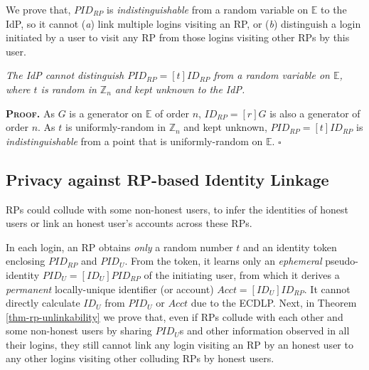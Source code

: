 We prove that, $PID_{RP}$ is \emph{indistinguishable} from a random variable on $\mathbb{E}$ to the IdP,
    so 
 it cannot (\emph{a}) link multiple logins visiting an RP, or (\emph{b}) distinguish a login initiated by a user to visit any RP from those logins visiting other RPs by this user. %


\vspace{-0.5mm}
\begin{thm}
\emph{The IdP cannot distinguish $PID_{RP} = [t]ID_{RP}$ from a random variable on $\mathbb{E}$, where $t$ is random in $\mathbb{Z}_n$ and kept unknown to the IdP.}\label{thm-idp-untraceability}
\end{thm}
\vspace{-0.5mm}

\noindent\textbf{\textsc{Proof.}}
As $G$ is a generator on $\mathbb{E}$ of order $n$, $ID_{RP} = [r]G$ is also a generator of order $n$.
As $t$ is uniformly-random in $\mathbb{Z}_n$ and kept unknown, $PID_{RP} = [t]ID_{RP}$ is \emph{indistinguishable} from a point that is uniformly-random on $\mathbb{E}$. \hfill $\square$
\vspace{1.5mm}


\subsection{Privacy against RP-based Identity Linkage}
\label{subsec:RP-privacy}

RPs could collude with some non-honest users,
    to infer the identities of honest users
    or link an honest user's accounts across these RPs.


In each login, an RP obtains \emph{only} a random number $t$ and an identity token enclosing $PID_{RP}$ and $PID_U$. From the token, it learns only an \emph{ephemeral} pseudo-identity $PID_{U} = [{ID_U}]{PID_{RP}}$ of the initiating user, from which it derives a \emph{permanent} locally-unique identifier (or account) $Acct = [ID_U]ID_{RP}$.
It cannot directly calculate $ID_U$ from $PID_{U}$ or $Acct$ due to the ECDLP.
Next, in Theorem \ref{thm-rp-unlinkability} we prove that, even if RPs collude with each other and some non-honest users by sharing $PID_U$s and other information observed in all their logins,
they still cannot link any login visiting an RP by an honest user to any other logins visiting other colluding RPs by honest users.


